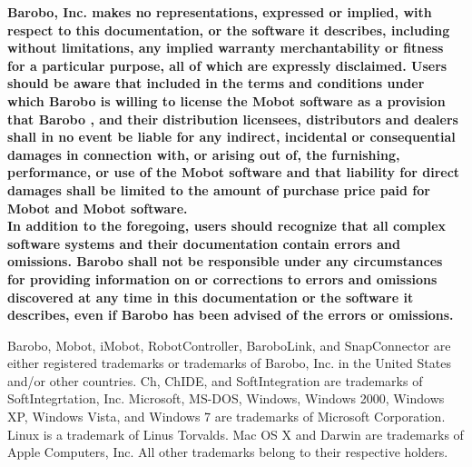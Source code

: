 \noindent
{\bf 
Barobo, Inc.
makes no representations, expressed or implied, with respect
to this documentation, or the software
it describes, including without limitations, any implied
warranty merchantability or fitness for a particular
purpose, all of which are expressly disclaimed.
Users should be aware that included in the terms and conditions
under which  Barobo is willing to license the Mobot software
as a provision that
Barobo , and their distribution
licensees, distributors and dealers shall in no event
be liable for any indirect, incidental or consequential
damages in connection with, 
or arising out of, the furnishing, performance,
or use of the Mobot software
and that liability for direct damages shall be limited
to the amount of purchase price paid for Mobot and Mobot software.\\

\noindent
In addition to the foregoing, users should recognize
that all complex software systems and their documentation
contain errors and omissions. Barobo
shall not be responsible under any circumstances
for providing information on or corrections to errors
and omissions discovered at any time in this documentation
or the software it describes,
even if Barobo has
been advised of the errors or omissions.\\
}


\noindent
Barobo, Mobot, iMobot, RobotController, BaroboLink, and SnapConnector
are either
registered trademarks or trademarks of Barobo, Inc.
in the United States and/or other countries.
Ch, ChIDE, and  SoftIntegration 
are trademarks of SoftIntegrtation, Inc.
Microsoft, MS-DOS, Windows, Windows 2000, Windows XP, 
Windows Vista, and Windows 7
are trademarks of Microsoft Corporation.
Linux is a trademark of Linus Torvalds.
Mac OS X and Darwin are trademarks of Apple Computers, Inc.
All other trademarks belong to their respective holders.
